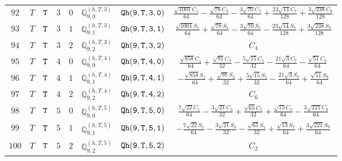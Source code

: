 \documentclass[fleqn,8pt]{jsarticle}
\begin{document}
\begin{table}[ht!]
\begin{center}
\begin{tabular}{cccccccc}
$ 92 $ & $ T $ & $ {\tt T} $ & $ 3 $ & $ 0 $ & $ \mathbb{Q}_{9,0}^{(h,T,3)} $ & $ {\tt Qh(9,T,3,0)} $ & $ \frac{\sqrt{1001} C_{1}}{64} - \frac{\sqrt{78} C_{3}}{64} - \frac{3 \sqrt{70} C_{5}}{64} + \frac{23 \sqrt{14} C_{7}}{128} + \frac{3 \sqrt{238} C_{9}}{128} $ \\
$ 93 $ & $ T $ & $ {\tt T} $ & $ 3 $ & $ 1 $ & $ \mathbb{Q}_{9,1}^{(h,T,3)} $ & $ {\tt Qh(9,T,3,1)} $ & $ \frac{\sqrt{1001} S_{1}}{64} + \frac{\sqrt{78} S_{3}}{64} - \frac{3 \sqrt{70} S_{5}}{64} - \frac{23 \sqrt{14} S_{7}}{128} + \frac{3 \sqrt{238} S_{9}}{128} $ \\
$ 94 $ & $ T $ & $ {\tt T} $ & $ 3 $ & $ 2 $ & $ \mathbb{Q}_{9,2}^{(h,T,3)} $ & $ {\tt Qh(9,T,3,2)} $ & $ C_{4} $ \\
$ 95 $ & $ T $ & $ {\tt T} $ & $ 4 $ & $ 0 $ & $ \mathbb{Q}_{9,0}^{(h,T,4)} $ & $ {\tt Qh(9,T,4,0)} $ & $ \frac{\sqrt{858} C_{1}}{64} + \frac{\sqrt{91} C_{3}}{32} - \frac{5 \sqrt{15} C_{5}}{32} - \frac{21 \sqrt{3} C_{7}}{64} - \frac{\sqrt{51} C_{9}}{64} $ \\
$ 96 $ & $ T $ & $ {\tt T} $ & $ 4 $ & $ 1 $ & $ \mathbb{Q}_{9,1}^{(h,T,4)} $ & $ {\tt Qh(9,T,4,1)} $ & $ - \frac{\sqrt{858} S_{1}}{64} + \frac{\sqrt{91} S_{3}}{32} + \frac{5 \sqrt{15} S_{5}}{32} - \frac{21 \sqrt{3} S_{7}}{64} + \frac{\sqrt{51} S_{9}}{64} $ \\
$ 97 $ & $ T $ & $ {\tt T} $ & $ 4 $ & $ 2 $ & $ \mathbb{Q}_{9,2}^{(h,T,4)} $ & $ {\tt Qh(9,T,4,2)} $ & $ C_{6} $ \\
$ 98 $ & $ T $ & $ {\tt T} $ & $ 5 $ & $ 0 $ & $ \mathbb{Q}_{9,0}^{(h,T,5)} $ & $ {\tt Qh(9,T,5,0)} $ & $ \frac{7 \sqrt{22} C_{1}}{64} - \frac{3 \sqrt{21} C_{3}}{32} + \frac{\sqrt{65} C_{5}}{32} + \frac{\sqrt{13} C_{7}}{64} - \frac{3 \sqrt{221} C_{9}}{64} $ \\
$ 99 $ & $ T $ & $ {\tt T} $ & $ 5 $ & $ 1 $ & $ \mathbb{Q}_{9,1}^{(h,T,5)} $ & $ {\tt Qh(9,T,5,1)} $ & $ - \frac{7 \sqrt{22} S_{1}}{64} - \frac{3 \sqrt{21} S_{3}}{32} - \frac{\sqrt{65} S_{5}}{32} + \frac{\sqrt{13} S_{7}}{64} + \frac{3 \sqrt{221} S_{9}}{64} $ \\
$ 100 $ & $ T $ & $ {\tt T} $ & $ 5 $ & $ 2 $ & $ \mathbb{Q}_{9,2}^{(h,T,5)} $ & $ {\tt Qh(9,T,5,2)} $ & $ C_{2} $ \\
 \hline \hline
\end{tabular}
\end{center}
\end{table}
\end{document}
